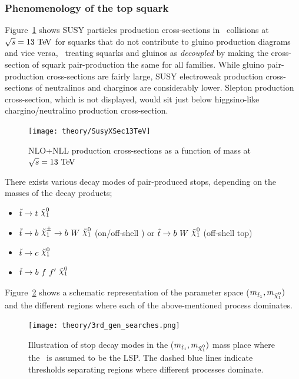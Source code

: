 			\subsubsection*{Phenomenology of the top squark}

				Figure~\ref{fig:susy_13TeV_xsec} shows \ac{SUSY} particles production cross-sections in \pp\ collisions at $\sqrt{s} = 13 \TeV$ for squarks that do not contribute to gluino production diagrams and vice versa, \ie\ treating squarks and gluinos as \textit{decoupled} by making the cross-section of squark pair-production the same for all families. While gluino pair-production cross-sections are fairly large, \ac{SUSY} electroweak production cross-sections of neutralinos and charginos are considerably lower. Slepton production cross-section, which is not displayed, would sit just below higgsino-like chargino/neutralino production cross-section. 

				\begin{figure}[!htb]
					\centering
					\texttt{[image: theory/SusyXSec13TeV]}
					\caption{\label{fig:susy_13TeV_xsec} NLO+NLL production cross-sections as a function of mass at $\sqrt{s} = 13 \TeV$~\cite{Borschensky:2014cia}}
				\end{figure}

				There exists various decay modes of pair-produced stops, depending on the masses of the decay products; 

				\begin{itemize}
					\item $\stop \ra t\ \ninoone$
					\item $\stop \ra b\ \chinoonepm \ra b\  W\  \ninoone$ (on/off-shell \Wboson) or $\stop \ra b\  W\  \ninoone$ (off-shell top)
					\item $\stop \ra c\ \ninoone$
					\item $\stop \ra b\ f\ f'\ \ninoone$
				\end{itemize} 

				Figure~\ref{fig:stop_topologies} shows a schematic representation of the parameter space ($m_{\stopone}, m_{\ninoone})$ and the different regions where each of the above-mentioned process dominates. %

				\begin{figure}[!htb]
					\centering
					\texttt{[image: theory/3rd\_gen\_searches.png]}
					\caption{\label{fig:stop_topologies} Illustration of stop decay modes in the ($m_{\stopone}, m_{\ninoone})$ mass place where the \ninoone\ is assumed to be the \ac{LSP}. The dashed blue lines indicate thresholds separating regions where different processes dominate.}
				\end{figure}

